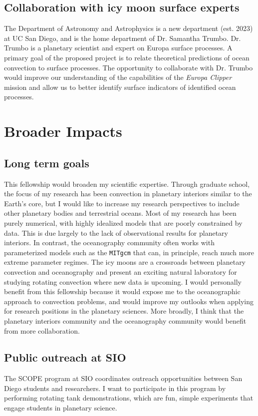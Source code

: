 \documentclass[12pt]{article}
\begin{document}
\subsection{Collaboration with icy moon surface experts}
The Department of Astronomy and Astrophysics is a new department (est. 2023) at UC San Diego, and is the home department of Dr. Samantha Trumbo. Dr. Trumbo is a planetary scientist and expert on Europa surface processes. 
A primary goal of the proposed project is to relate theoretical predictions of ocean convection to surface processes. The opportunity to collaborate with Dr. Trumbo would improve our understanding of the capabilities of the \textit{Europa Clipper} mission and allow us to better identify surface indicators of identified ocean processes.

\section{Broader Impacts}

\subsection{Long term goals}
This fellowship would broaden my scientific expertise. Through graduate school,
the focus of my research has been convection in planetary interiors similar to the Earth's core, but I would like to increase my research perspectives to include other planetary bodies and terrestrial oceans. Most of my research has been purely numerical, with highly idealized models that are poorly constrained by data. This is due largely to the lack of observational results for planetary interiors. In contrast, the oceanography community often works with parameterized models such as the \texttt{MITgcm}\citep{jM97} that can, in principle, reach much more extreme parameter regimes. The icy moons are a crossroads between planetary convection and oceanography and present an exciting natural laboratory for studying rotating convection where new data is upcoming. I would personally benefit from this fellowship because it would expose me to the oceanographic approach to convection problems, and would improve my outlooks when applying for research positions in the planetary sciences. More broadly, I think that the planetary interiors community and the oceanography community would benefit from more collaboration. 


\subsection{Public outreach at SIO}
The SCOPE program at SIO coordinates outreach opportunities between San Diego students and researchers. 
I want to participate in this program by performing rotating tank demonstrations, which are fun, simple experiments that engage students in planetary science.
%
\end{document}
